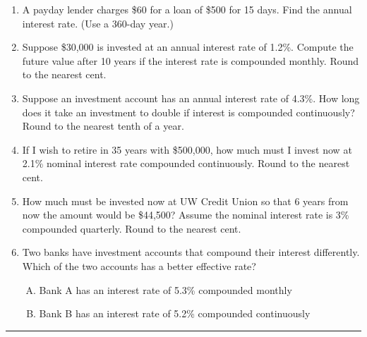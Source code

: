 \documentclass[12pt]{article}
\begin{document}
\begin{enumerate}
\item A payday lender charges \$60 for a loan of \$500 for 15 days. Find the annual interest rate. (Use a 360-day year.)
\vspace{2.5cm}

\item Suppose \$30,000 is invested at an annual interest rate of 1.2\%.  Compute the future value after 10 years if the interest rate is compounded monthly. Round to the nearest cent.
\vspace{2.5cm}

\item Suppose an investment account has an annual interest rate of 4.3\%.  How long does it take an investment to double if interest is compounded continuously?  Round to the nearest tenth of a year.
\vspace{2.5cm}

\item If I wish to retire in 35 years with \$500,000, how much must I invest now at 2.1\% nominal interest rate compounded continuously. Round to the nearest cent.
\vspace{3.0cm}

\item How much must be invested now at UW Credit Union so that 6 years from now the
amount would be \$44,500? Assume the nominal interest rate is 3\% compounded quarterly. Round to the nearest cent.
\vspace{3.0cm}

\item Two banks have investment accounts that compound their interest differently.  Which of the two accounts has a better effective rate?
\begin{enumerate}[A)]
	\item Bank A has an interest rate of 5.3\% compounded monthly
	\item Bank B has an interest rate of 5.2\% compounded continuously
\end{enumerate}
\end{enumerate}
\vspace{3.0cm}

\begin{center}\rule{4cm}{0.4pt}\end{center}
\end{document}
